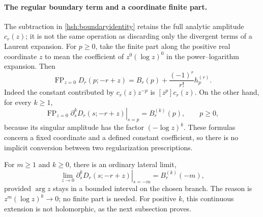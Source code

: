 \documentclass[11pt,a4paper]{article}
\numberwithin{equation}{section}
\theoremstyle{definition}
\theoremstyle{remark}
\DeclareMathOperator{\FP}{FP}
\begin{document}
\paragraph{The regular boundary term and a coordinate finite part.}
The subtraction in \eqref{hsh:boundaryidentity} retains the full
analytic amplitude $c_r(z)$; it is not the same operation as discarding
only the divergent terms of a Laurent expansion.  For $p\geq0$,
take the finite part along the positive real coordinate $z$ to mean
the coefficient of $z^0(\log z)^0$ in the power--logarithm expansion.
Then
\begin{equation}\label{hsh:FP}
 \boxed{\displaystyle
 \FP_{z=0}D_r(p;-r+z)=B_r(p)+\frac{(-1)^r}{r!}h_p^{(r)}.}
\end{equation}
Indeed the constant contributed by $c_r(z)z^{-p}$ is
$[z^p]c_r(z)$.  On the other hand, for every $k\geq1$,
\begin{equation}\label{hsh:FPjets}
 \FP_{z=0}\left.\partial_s^kD_r(s;-r+z)\right|_{s=p}
                       =B_r^{(k)}(p),\qquad p\geq0,
\end{equation}
because its singular amplitude has the factor $(-\log z)^k$.
These formulas concern a fixed coordinate and a defined constant
coefficient, so there is no implicit conversion between two
regularization prescriptions.

For $m\geq1$ and $k\geq0$, there is an ordinary lateral limit,
\begin{equation}\label{hsh:negativeboundary}
 \lim_{z\to0}\left.\partial_s^kD_r(s;-r+z)\right|_{s=-m}
                      =B_r^{(k)}(-m),
\end{equation}
provided $\arg z$ stays in a bounded interval on the chosen branch.
The reason is $z^m(\log z)^k\to0$; no finite part is needed.
For positive $k$, this continuous extension is not
holomorphic, as the next subsection proves.
\end{document}
